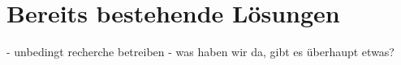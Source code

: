\chapter{Bereits bestehende Lösungen}

- unbedingt recherche betreiben 
- was haben wir da, gibt es überhaupt etwas? 
